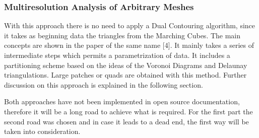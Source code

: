 \subsubsection{Multiresolution Analysis of Arbitrary Meshes}
With this approach there is no need to apply a Dual Contouring algorithm, since it takes as
beginning data the triangles from the Marching Cubes. The main concepts are shown in the paper
of the same name [4]. It mainly takes a series of intermediate steps which permits a parametrization of data. It includes a partitioning scheme based on the ideas of the Voronoi Diagrams and Delaunay triangulations. Large patches or quads are obtained with this method. Further discussion on this approach is explained in the following section.


Both approaches have not been implemented in open source documentation, therefore it will be
a long road to achieve what is required. For the first part the second
road was chosen and in case it leads to a dead end, the first way will be taken into consideration.

